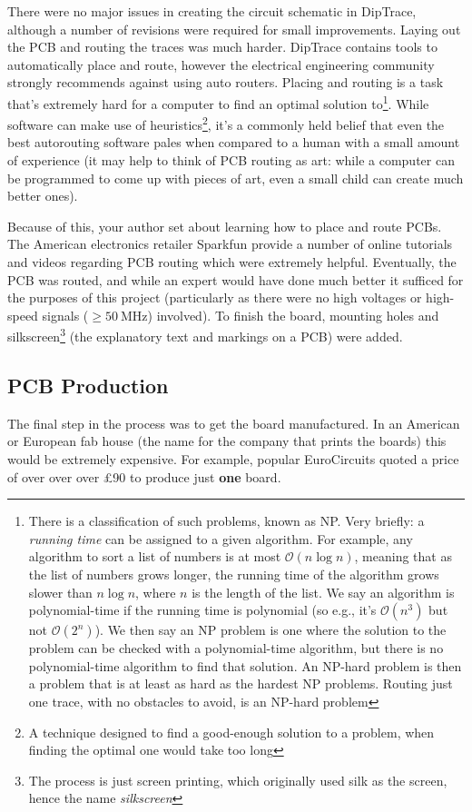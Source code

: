 There were no major issues in creating the circuit schematic in DipTrace,
although a number of revisions were required for small improvements. Laying out
the PCB and routing the traces was much harder. DipTrace contains tools to
automatically place and route, however the electrical engineering community
strongly recommends against using auto routers. Placing and routing is a task
that's extremely hard for a computer to find an optimal solution
to\footnote{There is a classification of such problems, known as NP. Very
  briefly: a \textit{running time} can be assigned to a given algorithm. For
  example, any algorithm to sort a list of numbers is at most
  $\mathcal{O}\left(n\log{n}\right)$, meaning that as the list of numbers grows
  longer, the running time of the algorithm grows slower than $n\log{n}$, where
  $n$ is the length of the list. We say an algorithm is polynomial-time if the
  running time is polynomial (so e.g., it's $\mathcal{O}\left(n^3\right)$ but
  not $\mathcal{O}\left(2^n\right)$). We then say an NP problem is one where the
  solution to the problem can be checked with a polynomial-time algorithm, but
  there is no polynomial-time algorithm to find that solution. An NP-hard
problem is then a problem that is at least as hard as the hardest NP problems.
Routing just one trace, with no obstacles to avoid, is an NP-hard problem}.
While software can make use of heuristics\footnote{A technique designed to find
a good-enough solution to a problem, when finding the optimal one would take too
long}, it's a commonly held belief that even the best autorouting software pales
when compared to a human with a small amount of experience (it may help to think
of PCB routing as art: while a computer can be programmed to come up with pieces
of art, even a small child can create much better ones).

Because of this, your author set about learning how to place and route PCBs. The
American electronics retailer Sparkfun provide a number of online tutorials and
videos regarding PCB routing which were extremely helpful. Eventually, the PCB
was routed, and while an expert would have done much better it sufficed for the
purposes of this project (particularly as there were no high voltages or
high-speed signals ($\ge\SI{50}{\MHz}$) involved). To finish the board, mounting
holes and silkscreen\footnote{The process is just screen printing, which
originally used silk as the screen, hence the name \textit{silkscreen}} (the
explanatory text and markings on a PCB) were added.

\subsection{PCB Production}
The final step in the process was to get the board manufactured. In an American
or European fab house (the name for the company that prints the boards) this
would be extremely expensive. For example, popular EuroCircuits quoted a price
of over over over \pounds 90 to produce just \textbf{one} board.

